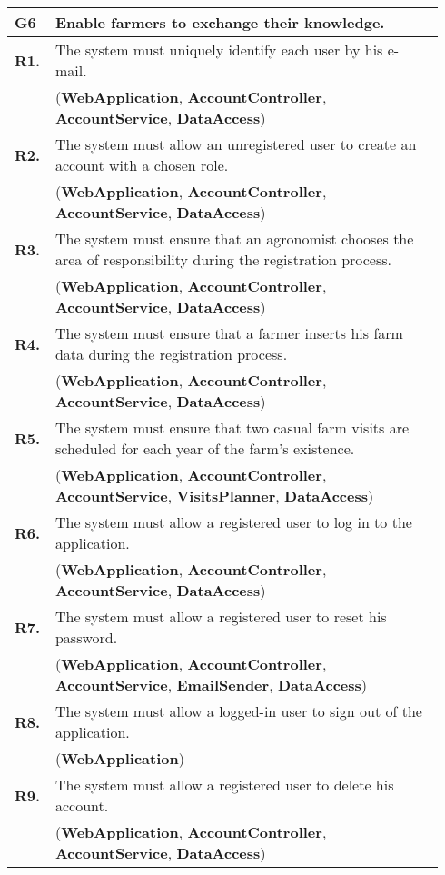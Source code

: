 \begin{longtable}{p{0.06\linewidth} p{0.88\linewidth}} 
    \toprule
    \textbf{G6} & Enable farmers to exchange their knowledge. \\ 
    \midrule
    
	\textbf{R1.} & The system must uniquely identify each user by his e-mail. \\
	& (\textbf{WebApplication}, \textbf{AccountController}, \textbf{AccountService}, \textbf{DataAccess})\\
	\textbf{R2.} & The system must allow an unregistered user to create an account with a chosen role. \\
	& (\textbf{WebApplication}, \textbf{AccountController}, \textbf{AccountService}, \textbf{DataAccess})\\
	\textbf{R3.} & The system must ensure that an agronomist chooses the area of responsibility during the registration process. \\
	& (\textbf{WebApplication}, \textbf{AccountController}, \textbf{AccountService}, \textbf{DataAccess})\\
	\textbf{R4.} & The system must ensure that a farmer inserts his farm data during the registration process.\\
	& (\textbf{WebApplication}, \textbf{AccountController}, \textbf{AccountService}, \textbf{DataAccess})\\
	\textbf{R5.} & The system must ensure that two casual farm visits are scheduled for each year of the farm's existence.\\
	& (\textbf{WebApplication}, \textbf{AccountController}, \textbf{AccountService}, \textbf{VisitsPlanner},
	\textbf{DataAccess})\\
	\textbf{R6.} & The system must allow a registered user to log in to the application. \\
	& (\textbf{WebApplication}, \textbf{AccountController}, \textbf{AccountService}, \textbf{DataAccess})\\
	\textbf{R7.} & The system must allow a registered user to reset his password. \\
	& (\textbf{WebApplication}, \textbf{AccountController}, \textbf{AccountService}, \textbf{EmailSender}, \textbf{DataAccess})\\
	\textbf{R8.} & The system must allow a logged-in user to sign out of the application. \\
	& (\textbf{WebApplication})\\
	\textbf{R9.} & The system must allow a registered user to delete his account. \\
	& (\textbf{WebApplication}, \textbf{AccountController}, \textbf{AccountService}, \textbf{DataAccess})\\
	

\end{longtable}
